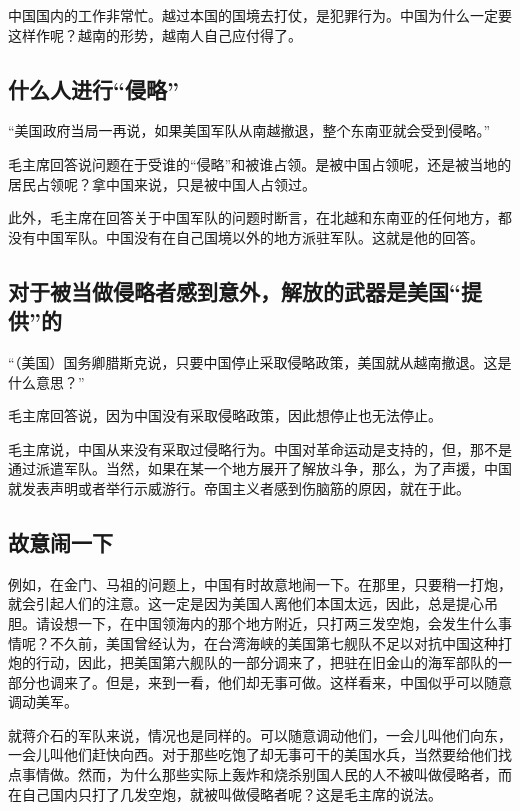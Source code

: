 中国国内的工作非常忙。越过本国的国境去打仗，是犯罪行为。中国为什么一定要这样作呢？越南的形势，越南人自己应付得了。

\subsection{什么人进行“侵略”}

“美国政府当局一再说，如果美国军队从南越撤退，整个东南亚就会受到侵略。”

毛主席回答说问题在于受谁的“侵略”和被谁占领。是被中国占领呢，还是被当地的居民占领呢？拿中国来说，只是被中国人占领过。

此外，毛主席在回答关于中国军队的问题时断言，在北越和东南亚的任何地方，都没有中国军队。中国没有在自己国境以外的地方派驻军队。这就是他的回答。

\subsection{对于被当做侵略者感到意外，解放的武器是美国“提供”的}

“（美国）国务卿腊斯克说，只要中国停止采取侵略政策，美国就从越南撤退。这是什么意思？”

毛主席回答说，因为中国没有采取侵略政策，因此想停止也无法停止。

毛主席说，中国从来没有采取过侵略行为。中国对革命运动是支持的，但，那不是通过派遣军队。当然，如果在某一个地方展开了解放斗争，那么，为了声援，中国就发表声明或者举行示威游行。帝国主义者感到伤脑筋的原因，就在于此。

\subsection{故意闹一下}

例如，在金门、马祖的问题上，中国有时故意地闹一下。在那里，只要稍一打炮，就会引起人们的注意。这一定是因为美国人离他们本国太远，因此，总是提心吊胆。请设想一下，在中国领海内的那个地方附近，只打两三发空炮，会发生什么事情呢？不久前，美国曾经认为，在台湾海峡的美国第七舰队不足以对抗中国这种打炮的行动，因此，把美国第六舰队的一部分调来了，把驻在旧金山的海军部队的一部分也调来了。但是，来到一看，他们却无事可做。这样看来，中国似乎可以随意调动美军。

就蒋介石的军队来说，情况也是同样的。可以随意调动他们，一会儿叫他们向东，一会儿叫他们赶快向西。对于那些吃饱了却无事可干的美国水兵，当然要给他们找点事情做。然而，为什么那些实际上轰炸和烧杀别国人民的人不被叫做侵略者，而在自己国内只打了几发空炮，就被叫做侵略者呢？这是毛主席的说法。


